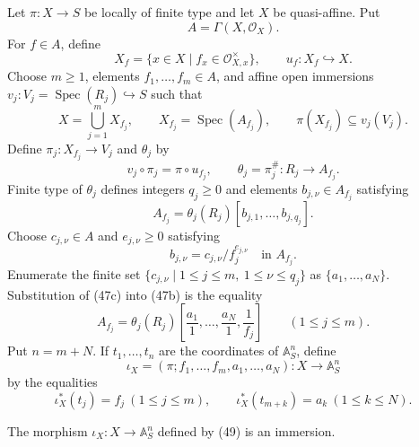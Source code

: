\begin{definition}
  \label{def:nagata-quasi-affine-immersion-affine-space}

  Let $\pi\colon X\to S$ be locally of finite type and let $X$ be
  quasi-affine.  Put
  \[
    A=\Gamma(X,\mathcal O_X).
  \]
  For $f\in A$, define
  \[
    X_f=\{x\in X\mid f_x\in\mathcal O_{X,x}^{\times}\},
    \qquad u_f\colon X_f\hookrightarrow X.
  \]
  Choose $m\geq1$, elements $f_1,\ldots,f_m\in A$, and affine open
  immersions
  $v_j\colon V_j=\operatorname{Spec}(R_j)\hookrightarrow S$ such that
  \[
    X=\bigcup_{j=1}^mX_{f_j},\qquad
    X_{f_j}=\operatorname{Spec}(A_{f_j}),\qquad
    \pi(X_{f_j})\subseteq v_j(V_j).
  \]
  Define $\pi_j\colon X_{f_j}\to V_j$ and $\theta_j$ by
  \[
    v_j\circ\pi_j=\pi\circ u_{f_j},
    \qquad
    \theta_j=\pi_j^\#\colon R_j\to A_{f_j}.                       \tag{47a}
  \]
  Finite type of $\theta_j$ defines integers $q_j\geq0$ and elements
  $b_{j,\nu}\in A_{f_j}$ satisfying
  \[
    A_{f_j}=\theta_j(R_j)[b_{j,1},\ldots,b_{j,q_j}].              \tag{47b}
  \]
  Choose $c_{j,\nu}\in A$ and $e_{j,\nu}\geq0$ satisfying
  \[
    b_{j,\nu}=c_{j,\nu}/f_j^{e_{j,\nu}}\quad\text{in }A_{f_j}.    \tag{47c}
  \]
  Enumerate the finite set
  $\{c_{j,\nu}\mid1\leq j\leq m,\ 1\leq\nu\leq q_j\}$ as
  $\{a_1,\ldots,a_N\}$.  Substitution of (47c) into (47b) is the equality
  \[
    A_{f_j}
      =\theta_j(R_j)\!\left[
          \frac{a_1}{1},\ldots,\frac{a_N}{1},\frac1{f_j}
        \right]\qquad(1\leq j\leq m).                              \tag{48}
  \]
  Put $n=m+N$.  If $t_1,\ldots,t_n$ are the coordinates of
  $\mathbb A^n_S$, define
  \[
    \iota_X=(\pi;f_1,\ldots,f_m,a_1,\ldots,a_N)
      \colon X\to\mathbb A^n_S                                   \tag{49}
  \]
  by the equalities
  \[
    \iota_X^*(t_j)=f_j\ (1\leq j\leq m),\qquad
    \iota_X^*(t_{m+k})=a_k\ (1\leq k\leq N).
  \]
\end{definition}

\begin{lemma}
  \label{lemma:nagata-quasi-affine-immersion-affine-space}

  The morphism $\iota_X\colon X\to\mathbb A^n_S$ defined by (49) is an
  immersion.
\end{lemma}


